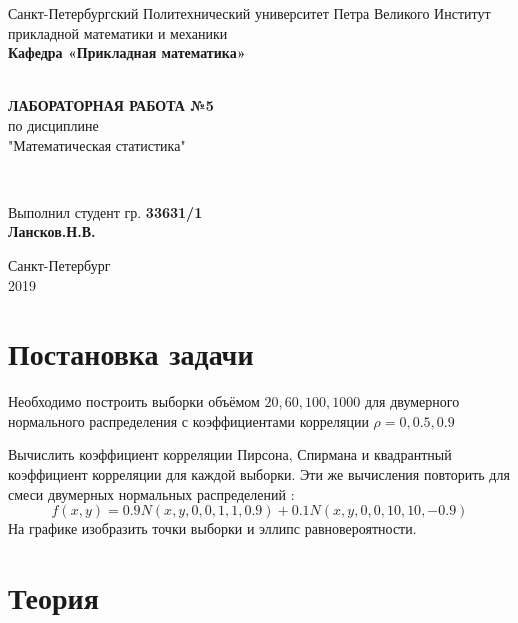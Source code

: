 \documentclass[12pt]{article}
\begin{document}
\begin{titlepage}
	\center
		Санкт-Петербургский Политехнический 
		университет Петра Великого
		Институт прикладной математики и механики
		\\ \textbf{Кафедра «Прикладная математика»}

	\vfill ~
	\textbf{
		\\ \large ЛАБОРАТОРНАЯ РАБОТА №5
	}
	\\	по дисциплине 
	\\	"Математическая статистика"

	\vfill ~

	Выполнил студент гр. \textbf{33631/1} \\
	\textbf{Лансков.Н.В.} \\ 

\vfill

{\large}	Санкт-Петербург
\\ 2019
\end{titlepage}

\tableofcontents
\newpage
\listoftables
\newpage
\pagebreak


\section{Постановка задачи}
Необходимо построить выборки объёмом $20, 60, 100, 1000$ для двумерного нормального распределения с коэффициентами корреляции $\rho = 0, 0.5, 0.9$

Вычислить коэффициент корреляции Пирсона, Спирмана и квадрантный коэффициент корреляции для каждой выборки. Эти же вычисления повторить для смеси двумерных нормальных распределений \cite{mix}: 
\begin{equation}
    f(x,y) = 0.9N(x,y,0,0,1,1,0.9)+0.1N(x,y,0,0,10,10,-0.9)
\end{equation}
На графике изобразить точки выборки и эллипс равновероятности.

\section{Теория}
\end{document}
